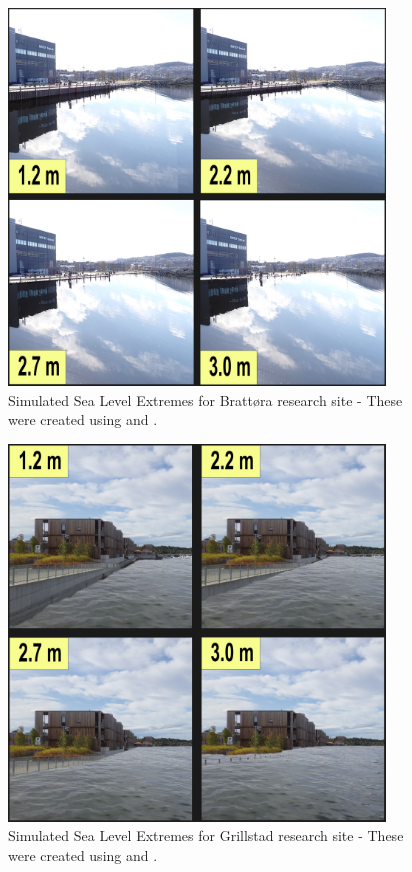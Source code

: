 \begin{figure}[h!]
    \centering
    \includegraphics[width=10cm]{fig_sle/brattora 2090 q.png}
    \caption{Simulated Sea Level Extremes for Brattøra research site - These were created using \cite{kartverket_se_2021} and \cite{stormflo_database_stormflo_2021}. }
    \label{fig:SLE-brattora}
\end{figure}

\begin{figure}[h!]
    \centering
    \includegraphics[width=10cm]{fig_sle/grillstad 2090 q.png}
    \caption{Simulated Sea Level Extremes for Grillstad research site - These were created using \cite{kartverket_se_2021} and \cite{stormflo_database_stormflo_2021}. }
    \label{fig:SLE-grillstad}
\end{figure}

